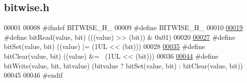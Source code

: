 \hypertarget{bitwise_8h_source}{}\subsection{bitwise.\+h}
\label{bitwise_8h_source}

\begin{DoxyCode}
00001 
00008 \textcolor{preprocessor}{#ifndef BITWISE\_H\_}
00009 \textcolor{preprocessor}{#define BITWISE\_H\_}
00010 
\hypertarget{bitwise_8h_source.tex_l00019}{}\hyperlink{bitwise_8h_aff20d8c0a05ad3043afa2e4ad9ebe768}{00019} \textcolor{preprocessor}{#define bitRead(value, bit) (((value) >> (bit)) & 0x01)}
00020 
\hypertarget{bitwise_8h_source.tex_l00027}{}\hyperlink{bitwise_8h_a6a8195c0e930f86c6af03ba6af8b41dd}{00027} \textcolor{preprocessor}{#define bitSet(value, bit) ((value) |= (1UL << (bit)))}
00028 
\hypertarget{bitwise_8h_source.tex_l00035}{}\hyperlink{bitwise_8h_abbe843c0521806a4ab2e7cffe44769e2}{00035} \textcolor{preprocessor}{#define bitClear(value, bit) ((value) &= ~(1UL << (bit)))}
00036 
\hypertarget{bitwise_8h_source.tex_l00044}{}\hyperlink{bitwise_8h_a42c17f59f3f9a3112d01246760067a8e}{00044} \textcolor{preprocessor}{#define bitWrite(value, bit, bitvalue) (bitvalue ? bitSet(value, bit) : bitClear(value, bit))}
00045 
00046 \textcolor{preprocessor}{#endif}
\end{DoxyCode}
